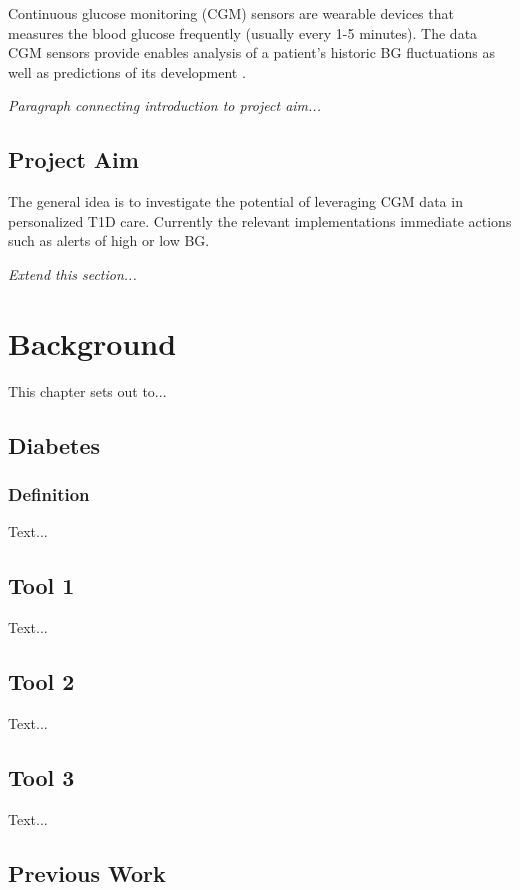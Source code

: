 \documentclass{kththesis}
\begin{document}
Continuous glucose monitoring (CGM) sensors are wearable devices that measures the blood glucose frequently (usually every 1-5 minutes).
The data CGM sensors provide enables analysis of a patient's historic BG fluctuations as well as predictions of its development \parencite{Facchinetti2016}.

\textit{Paragraph connecting introduction to project aim...}

\section{Project Aim}

The general idea is to investigate the potential of leveraging CGM data in personalized T1D care.
Currently the relevant implementations immediate actions such as alerts of high or low BG.

\textit{Extend this section...}

\chapter{Background}

This chapter sets out to...

\section{Diabetes}

\subsection{Definition}

Text...

\section{Tool 1}
Text...

\section{Tool 2}
Text...

\section{Tool 3}
Text...

\section{Previous Work}
\end{document}
